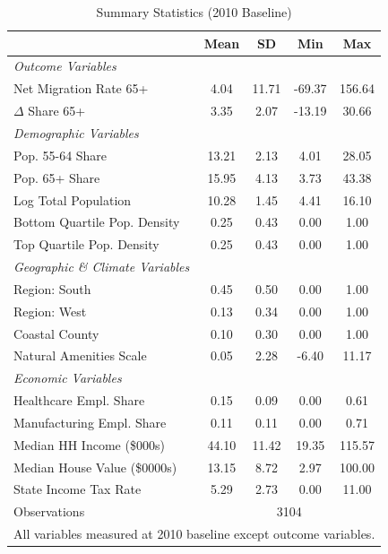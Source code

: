 \begin{table}[htbp!]
\centering
\caption{Summary Statistics (2010 Baseline)}
\label{tab:summary_stats}
\begin{tabular}{lcccc}
\hline\hline
 & Mean & SD & Min & Max \\
\hline
\textit{Outcome Variables} \\
\quad Net Migration Rate 65+ & 4.04 & 11.71 & -69.37 & 156.64 \\
\quad $\Delta$ Share 65+ & 3.35 & 2.07 & -13.19 & 30.66 \\
[3pt]
\textit{Demographic Variables} \\
\quad Pop. 55-64 Share & 13.21 & 2.13 & 4.01 & 28.05 \\
\quad Pop. 65+ Share & 15.95 & 4.13 & 3.73 & 43.38 \\
\quad Log Total Population & 10.28 & 1.45 & 4.41 & 16.10 \\
\quad Bottom Quartile Pop. Density & 0.25 & 0.43 & 0.00 & 1.00 \\
\quad Top Quartile Pop. Density & 0.25 & 0.43 & 0.00 & 1.00 \\
[3pt]
\textit{Geographic \& Climate Variables} \\
\quad Region: South & 0.45 & 0.50 & 0.00 & 1.00 \\
\quad Region: West & 0.13 & 0.34 & 0.00 & 1.00 \\
\quad Coastal County & 0.10 & 0.30 & 0.00 & 1.00 \\
\quad Natural Amenities Scale & 0.05 & 2.28 & -6.40 & 11.17 \\
[3pt]
\textit{Economic Variables} \\
\quad Healthcare Empl. Share & 0.15 & 0.09 & 0.00 & 0.61 \\
\quad Manufacturing Empl. Share & 0.11 & 0.11 & 0.00 & 0.71 \\
\quad Median HH Income (\$000s) & 44.10 & 11.42 & 19.35 & 115.57 \\
\quad Median House Value (\$0000s) & 13.15 & 8.72 & 2.97 & 100.00 \\
\quad State Income Tax Rate & 5.29 & 2.73 & 0.00 & 11.00 \\
[3pt]
\hline
Observations & \multicolumn{4}{c}{3104} \\
\hline\hline
\multicolumn{5}{l}{\footnotesize All variables measured at 2010 baseline except outcome variables.} \\
\end{tabular}
\end{table}